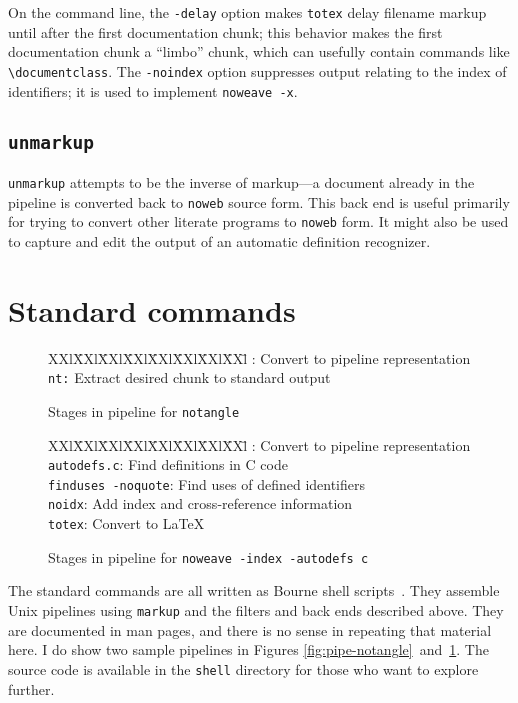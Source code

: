 \documentclass{article}
\newcommand\ltxlabel{\relax}
\let\ltxlabel=\label
\renewcommand\label{{\rm\it label\/}}
\begin{document}
On the command line, the {\tt -delay} option makes {\tt totex} delay
filename markup until after the first documentation chunk; this
behavior makes the first documentation chunk a ``limbo''
chunk, which can usefully contain commands like \verb+\documentclass+.
The {\tt -noindex} option suppresses output relating to the index of
identifiers; it is used to implement {\tt noweave -x}.
{\hfuzz=1.2pt\par}

\subsection{\tt unmarkup}

{\tt unmarkup} attempts to  be the inverse of markup---a document
already in the pipeline is converted back to {\tt noweb} source form.
This back end is useful primarily for trying to convert other literate
programs to {\tt noweb} form.
It might also be used to capture and edit the output of an automatic
definition recognizer.

\section{Standard commands}


\begin{figure}[t]
\noindent
\begin{tabbing}
XXl\=XXl\=XXl\=XXl\=XXl\=XXl\=XXl\=XXl\={}\kill
\>: Convert to pipeline representation\+\\
{\tt nt:} Extract desired chunk to standard output
\end{tabbing}
\caption{Stages in pipeline for {\tt notangle}}
\ltxlabel{fig:pipe-notangle}

\noindent
\begin{tabbing}
XXl\=XXl\=XXl\=XXl\=XXl\=XXl\=XXl\=XXl\={}\kill
\>: Convert to pipeline representation\+\\
{\tt autodefs.c}: Find definitions in C code\+\\
{\tt finduses -noquote}: Find uses of defined identifiers\+\\
{\tt noidx}: Add index and cross-reference information\+\\
{\tt totex}: Convert to {\LaTeX}
\end{tabbing}
\caption{Stages in pipeline for {\tt noweave -index -autodefs c}}
\ltxlabel{fig:pipe-noweave}
\end{figure}


The standard commands are all written as Bourne shell scripts~\cite{kernighan:unix}.
They assemble Unix pipelines using {\tt markup} and the filters and
back ends described above.  They are documented in man pages, and
there is no sense in repeating that material here.
I do show two sample pipelines in
Figures \ref{fig:pipe-notangle}~and~\ref{fig:pipe-noweave}.
The source code is available in the {\tt shell} directory for those
who want to explore further.
\end{document}
